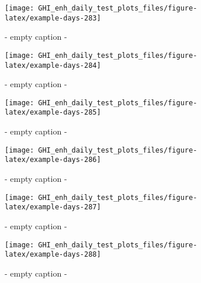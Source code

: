 \documentclass[
  10pt,
  a4paper,oneside]{article}
\begin{document}
\begin{figure}[H]

{\centering \texttt{[image: GHI\_enh\_daily\_test\_plots\_files/figure-latex/example-days-283]} 

}

\caption{ - empty caption - }\label{fig:example-days-283}
\end{figure}

\begin{figure}[H]

{\centering \texttt{[image: GHI\_enh\_daily\_test\_plots\_files/figure-latex/example-days-284]} 

}

\caption{ - empty caption - }\label{fig:example-days-284}
\end{figure}

\begin{figure}[H]

{\centering \texttt{[image: GHI\_enh\_daily\_test\_plots\_files/figure-latex/example-days-285]} 

}

\caption{ - empty caption - }\label{fig:example-days-285}
\end{figure}

\begin{figure}[H]

{\centering \texttt{[image: GHI\_enh\_daily\_test\_plots\_files/figure-latex/example-days-286]} 

}

\caption{ - empty caption - }\label{fig:example-days-286}
\end{figure}

\begin{figure}[H]

{\centering \texttt{[image: GHI\_enh\_daily\_test\_plots\_files/figure-latex/example-days-287]} 

}

\caption{ - empty caption - }\label{fig:example-days-287}
\end{figure}

\begin{figure}[H]

{\centering \texttt{[image: GHI\_enh\_daily\_test\_plots\_files/figure-latex/example-days-288]} 

}

\caption{ - empty caption - }\label{fig:example-days-288}
\end{figure}
\end{document}
